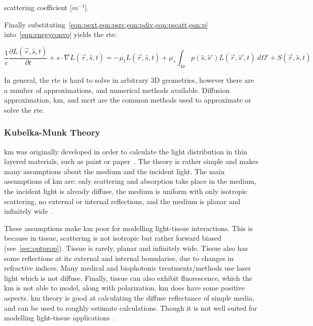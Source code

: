 \indent scattering coefficient [$m^{-1}$].

\medskip


Finally substituting~\cref{eqn:pext,eqn:psrc,eqn:pdiv,eqn:pscatt,eqn:p} into~\cref{eqn:enegyconvo} yields the \gls*{rte}:

\begin{equation}
\frac{1}{c}\frac{\partial L(\vec{r},\hat{s},t)}{\partial t} + s\cdot \nabla L(\vec{r},\hat{s},t)=-\mu_tL(\vec{r},\hat{s},t)+\mu_s\int_{4\pi}p(\hat{s},\hat{s}')L(\vec{r},\hat{s}',t)\ d\Omega' + S(\vec{r},\hat{s},t)
\label{eqn:rte}
\end{equation}


In general, the \gls*{rte} is hard to solve in arbitrary 3D geometries, however there are a number of approximations, and numerical methods available. Diffusion approximation, \gls*{km}, and \gls*{mcrt} are the common methods used to approximate or solve the \gls*{rte}.

\subsubsection*{Kubelka-Munk Theory}
\gls*{km} was originally developed in order to calculate the light distribution in thin layered materials, such as paint or paper~\cite{barbaric2011kubelka}. The theory is rather simple and makes many assumptions about the medium and the incident light. The main assumptions of \gls*{km} are: only scattering and absorption take place in the medium, the incident light is already diffuse, the medium is uniform with only isotropic scattering, no external or internal reflections, and the medium is planar and infinitely wide~\cite{jasinski2011modelling,cheong1990review,gabriela2013mathematical}.

These assumptions make \gls*{km} poor for modelling light-tissue interactions.
This is because in tissue, scattering is not isotropic but rather forward biased (see~\cref{sec:optprop}). 
Tissue is rarely, planar and infinitely wide. 
Tissue also has some reflections at its external and internal boundaries, due to changes in refractive indices. 
Many medical and biophotonic treatments/methods use laser light which is not diffuse. Finally, tissue can also exhibit fluorescence, which the \gls*{km} is not able to model, along with polarization. 
\gls*{km} does have some positive aspects.
\Gls{km} theory is good at calculating the diffuse reflectance of simple media, and can be used to roughly estimate calculations. Though it is not well suited for modelling light-tissue applications~\cite{prahl1990light}.

